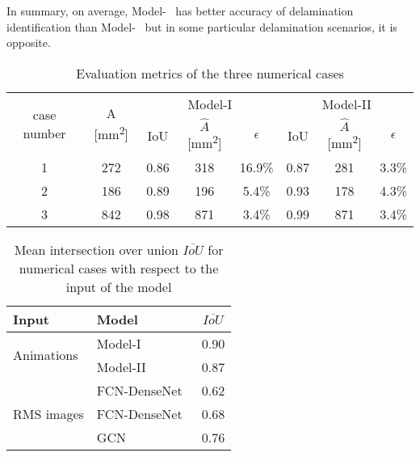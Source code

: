 In summary, on average, Model-~ has better accuracy of delamination identification than Model-~ but in some particular delamination scenarios, it is opposite.
\begin{table}[]
\small\sf\centering
	\caption{Evaluation metrics of the three numerical cases}
	\begin{tabular}{cccccccc}
		\toprule
		\multirow{2}{*}{case number} & \multicolumn{1}{c}{\multirow{2}{*}{A [mm\textsuperscript{2}]}} & \multicolumn{3}{c}{Model-I} & \multicolumn{3}{c}{Model-II} \\ \cmidrule(lr){3-5} \cmidrule(lr){6-8} 
		& \multicolumn{1}{c}{}  & \multicolumn{1}{c}{IoU}  & \multicolumn{1}{c}{\(\hat{A}\) [mm\textsuperscript{2}]} & \(\epsilon\) & \multicolumn{1}{c}{IoU}  & \multicolumn{1}{c}{\(\hat{A}\) [mm\textsuperscript{2}]} & \(\epsilon\) \\ 
		\midrule
		1 & 272 & \multicolumn{1}{c}{0.86} & \multicolumn{1}{c}{318} & 16.9\% & \multicolumn{1}{c}{0.87} & \multicolumn{1}{c}{281} & 3.3\% \\ 
		2 &  186  & \multicolumn{1}{c}{0.89} & \multicolumn{1}{c}{196} & 5.4\% & \multicolumn{1}{c}{0.93} & \multicolumn{1}{c}{178} & 4.3\% \\ 
		3 & 842 & \multicolumn{1}{c}{0.98} &\multicolumn{1}{c}{871} & 3.4\%   & \multicolumn{1}{c}{0.99} & \multicolumn{1}{c}{871} & 3.4\% \\ 
		\bottomrule
	\end{tabular}	
	\label{tab:num_cases}
\end{table}
\begin{table}[]
\small\sf\centering
	\caption{Mean intersection over union \(\overline{IoU}\) for numerical cases with respect to the input of the model}
	\begin{tabular}{llc}
		\toprule
		Input & Model & \(\overline{IoU}\) \\ 
		\midrule
		\multirow{2}{*}{Animations} & Model-I & 0.90 \\ & Model-II                    & 0.87     \\ \midrule
		\multirow{3}{*}{RMS images}  & FCN-DenseNet~\cite{Ijjeh2021} & 0.62     \\
		& FCN-DenseNet~\cite{Ijjeh2022} & 0.68     \\
		& GCN~\cite{Ijjeh2022}          & 0.76     \\ 
		\bottomrule
	\end{tabular}
	\label{tab:meanIoU_vs_input}
\end{table}
